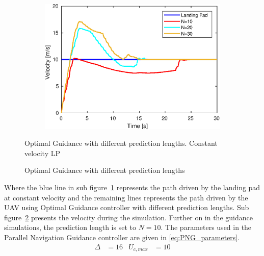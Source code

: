 \begin{figure}[ht!]
\begin{subfigure}[b]{.5\textwidth}
		\label{fig:variousPredLen_pos}
	\end{subfigure}%
	\begin{subfigure}[b]{.5\textwidth}
		\centering
		\includegraphics[width=\linewidth]{img/plot/simulation/pred_length_vel.eps}
		\label{fig:variousPredLen_vel}
	\end{subfigure}
	\caption{Optimal Guidance with different prediction lengths}{Optimal Guidance with different prediction lengths. Constant velocity LP}\label{fig:variousPredLen}
\end{figure}
Where the blue line in sub figure~\ref{fig:variousPredLen_pos} represents the path driven by the landing pad at constant velocity and the remaining lines represents the path driven by the UAV using Optimal Guidance controller with different prediction lengths. Sub figure~\ref{fig:variousPredLen_vel} presents the velocity during the simulation. Further on in the guidance simulations, the prediction length is set to $N=10$. The parameters used in the Parallel Navigation Guidance controller are given in \ref{eq:PNG_parameters}.
\begin{align}\label{eq:PNG_parameters}
	\Delta&=16
	&
	U_{c,max}&=10
\end{align}

